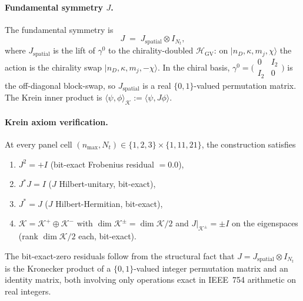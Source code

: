 \documentclass[11pt]{article}
\begin{document}
\paragraph{Fundamental symmetry $J$.}
The fundamental symmetry is
\begin{equation}
\label{eq:l2b_J_def}
   J \;=\; J_{\mathrm{spatial}} \otimes I_{N_t},
\end{equation}
where $J_{\mathrm{spatial}}$ is the lift of $\gamma^0$ to the
chirality-doubled $\mathcal{H}_{\mathrm{GV}}$: on
$|n_D, \kappa, m_j, \chi\rangle$ the action is the chirality swap
$|n_D, \kappa, m_j, -\chi\rangle$.  In the chiral basis,
$\gamma^0 = \bigl(\begin{smallmatrix} 0 & I_2 \\ I_2 & 0 \end{smallmatrix}\bigr)$
is the off-diagonal block-swap, so $J_{\mathrm{spatial}}$ is a real
$\{0, 1\}$-valued permutation matrix.  The Krein inner product is
$\langle \psi, \phi \rangle_{\mathcal{K}} :=
\langle \psi, J \phi \rangle$.

\paragraph{Krein axiom verification.}
At every panel cell $(n_{\max}, N_t) \in \{1, 2, 3\} \times \{1, 11,
21\}$, the construction satisfies
\begin{enumerate}\setlength{\itemsep}{2pt}
\item $J^2 = +I$ (bit-exact Frobenius residual $= 0.0$),
\item $J^* J = I$ ($J$ Hilbert-unitary, bit-exact),
\item $J^* = J$ ($J$ Hilbert-Hermitian, bit-exact),
\item $\mathcal{K} = \mathcal{K}^+ \oplus \mathcal{K}^-$ with
$\dim \mathcal{K}^\pm = \dim \mathcal{K}/2$ and $J|_{\mathcal{K}^\pm}
= \pm I$ on the eigenspaces (rank $\dim \mathcal{K}/2$ each, bit-exact).
\end{enumerate}
The bit-exact-zero residuals follow from the structural fact that
$J = J_{\mathrm{spatial}} \otimes I_{N_t}$ is the Kronecker product of
a $\{0, 1\}$-valued integer permutation matrix and an identity matrix,
both involving only operations exact in IEEE~754 arithmetic on real
integers.
\end{document}
